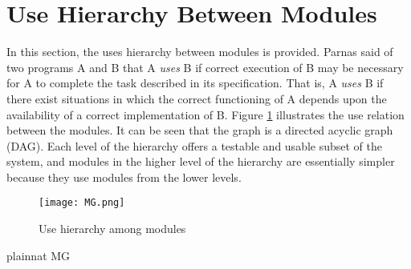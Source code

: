 \documentclass[12pt, titlepage]{article}
\begin{document}
\section{Use Hierarchy Between Modules} \label{SecUse}

In this section, the uses hierarchy between modules is
provided. Parnas said of two programs A and B that A {\em uses} B if
correct execution of B may be necessary for A to complete the task described in
its specification. That is, A {\em uses} B if there exist situations in which
the correct functioning of A depends upon the availability of a correct
implementation of B.  Figure \ref{FigUH} illustrates the use relation between
the modules. It can be seen that the graph is a directed acyclic graph
(DAG). Each level of the hierarchy offers a testable and usable subset of the
system, and modules in the higher level of the hierarchy are essentially simpler
because they use modules from the lower levels.

\begin{figure}[H]
\centering
\texttt{[image: MG.png]}
\caption{Use hierarchy among modules}
\label{FigUH}
\end{figure}


 {plainnat}
 {MG}
\end{document}

